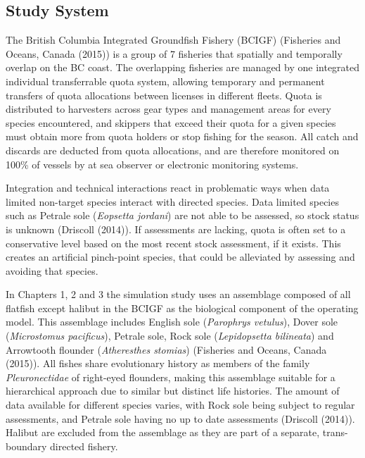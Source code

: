 \documentclass[12pt,]{scrartcl}
\begin{document}
\subsection{Study System}\label{study-system}

The British Columbia Integrated Groundfish Fishery (BCIGF) (Fisheries
and Oceans, Canada (2015)) is a group of 7 fisheries that spatially and
temporally overlap on the BC coast. The overlapping fisheries are
managed by one integrated individual transferrable quota system,
allowing temporary and permanent transfers of quota allocations between
licenses in different fleets. Quota is distributed to harvesters across
gear types and management areas for every species encountered, and
skippers that exceed their quota for a given species must obtain more
from quota holders or stop fishing for the season. All catch and
discards are deducted from quota allocations, and are therefore
monitored on 100\% of vessels by at sea observer or electronic
monitoring systems.

Integration and technical interactions react in problematic ways when
data limited non-target species interact with directed species. Data
limited species such as Petrale sole (\emph{Eopsetta jordani}) are not
able to be assessed, so stock status is unknown (Driscoll (2014)). If
assessments are lacking, quota is often set to a conservative level
based on the most recent stock assessment, if it exists. This creates an
artificial pinch-point species, that could be alleviated by assessing
and avoiding that species.

In Chapters 1, 2 and 3 the simulation study uses an assemblage composed
of all flatfish except halibut in the BCIGF as the biological component
of the operating model. This assemblage includes English sole
(\emph{Parophrys vetulus}), Dover sole (\emph{Microstomus pacificus}),
Petrale sole, Rock sole (\emph{Lepidopsetta bilineata}) and Arrowtooth
flounder (\emph{Atheresthes stomias}) (Fisheries and Oceans, Canada
(2015)). All fishes share evolutionary history as members of the family
\emph{Pleuronectidae} of right-eyed flounders, making this assemblage
suitable for a hierarchical approach due to similar but distinct life
histories. The amount of data available for different species varies,
with Rock sole being subject to regular assessments, and Petrale sole
having no up to date assessments (Driscoll (2014)). Halibut are excluded
from the assemblage as they are part of a separate, trans-boundary
directed fishery.
\end{document}
